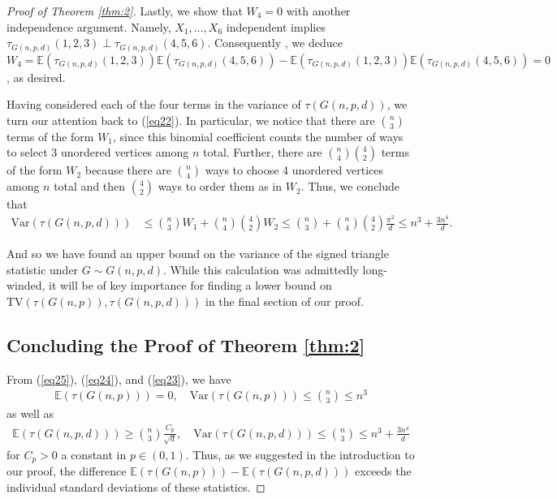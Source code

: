 \documentclass{article}
\begin{document}
\begin{proof}[Proof of Theorem \ref{thm:2}]
Lastly, we show that $W_4 = 0$ with another independence argument. Namely, $X_1, \ldots , X_6$ independent implies $\tau_{G(n,p,d)}(1,2,3) \perp \tau_{G(n,p,d)}(4,5,6)$. Consequently , we deduce $W_4 = \mathbb{E}\left(\tau_{G(n,p,d)}(1,2,3) \right)\mathbb{E}\left(\tau_{G(n,p,d)}(4,5,6)\right) - \mathbb{E}\left(\tau_{G(n,p,d)}(1,2,3)\right)\mathbb{E}\left(\tau_{G(n,p,d)}(4,5,6)\right) = 0$, as desired.

Having considered each of the four terms in the variance of $\tau(G(n,p,d))$, we turn our attention back to (\ref{eq22}). In particular, we notice that there are $\binom{n}{3}$ terms of the form $W_1$, since this binomial coefficient counts the number of ways to select $3$ unordered vertices among $n$ total. Further, there are $\binom{n}{4}\binom{4}{2}$ terms of the form $W_2$ because there are $\binom{n}{4}$ ways to choose 4 unordered vertices among $n$ total and then $\binom{4}{2}$ ways to order them as in $W_2$. Thus, we conclude that
\begin{align}
    \text{Var}(\tau(G(n,p,d))) &\leq \binom{n}{3}W_1 + \binom{n}{4}\binom{4}{2}W_2 \leq \binom{n}{3} + \binom{n}{4}\binom{4}{2}\frac{\pi^2}{d} \leq n^3 + \frac{3n^4}{d}\label{eq23}.
\end{align}

And so we have found an upper bound on the variance of the signed triangle statistic under $G \sim G(n, p, d)$. While this calculation was admittedly long-winded, it will be of key importance for finding a lower bound on $\text{TV}(\tau(G(n,p)), \tau(G(n,p,d)))$ in the final section of our proof.

\subsection{Concluding the Proof of Theorem \ref{thm:2}}
From (\ref{eq25}), (\ref{eq24}), and (\ref{eq23}), we have 
\begin{align*}
    \mathbb{E}\left(\tau(G(n,p)) \right) = 0, \quad \text{Var}\left(\tau(G(n,p)) \right) \leq \binom{n}{3} \leq n^3
\end{align*}
as well as
\begin{align*}
    \mathbb{E}\left(\tau(G(n,p,d)) \right) \geq \binom{n}{3}\frac{C_p}{\sqrt{d}}, \quad \text{Var}\left(\tau(G(n,p,d)) \right) \leq \binom{n}{3} \leq n^3 + \frac{3n^4}{d}
\end{align*}
for $C_p > 0$ a constant in $p \in (0,1)$. Thus, as we suggested in the introduction to our proof, the difference $\mathbb{E}\left(\tau(G(n,p)) \right) - \mathbb{E}\left(\tau(G(n,p,d)) \right)$ exceeds the individual standard deviations of these statistics.


\end{proof}
\end{document}
